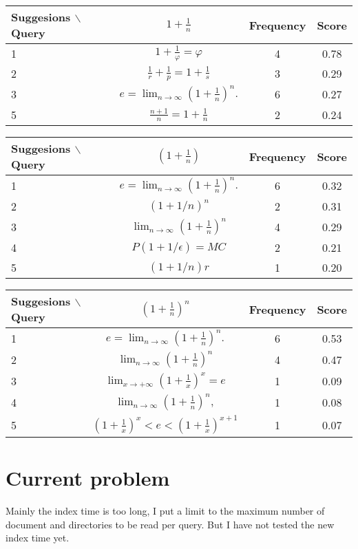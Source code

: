 \documentclass[12pt]{article} %
\begin{document}
\begin{center}
\begin{tabular}{lccc}
Suggesions $\backslash$ Query  & $ 1+\frac 1 n $ & Frequency & Score \\
\hline
 1 &  $ 1+\frac{1}{\varphi}=\varphi $ & 4 & 0.78 \\
 2 &  $ \frac{1}{r}+\frac{1}{p}=1+\frac{1}{s} $ & 3 & 0.29 \\
 3 &  $ e=\lim_{n\to\infty}\left(1+\frac{1}{n}\right)^{n}. $ & 6 & 0.27 \\
 5 &  $ \frac{n+1}{n}=1+\frac{1}{n} $ & 2 & 0.24 \\
\end{tabular}
\end{center}

\begin{center}
\begin{tabular}{lccc}
Suggesions $\backslash$ Query  & $ (1+\frac 1 n) $ & Frequency & Score \\
\hline
 1 &  $ e=\lim_{n\to\infty}\left(1+\frac{1}{n}\right)^{n}. $ & 6 & 0.32 \\
 2 &  $ (1+1/n)^{n} $ & 2 & 0.31 \\
 3 &  $  \lim_{n\to\infty}\left(1+\frac{1}{n}\right)^{n} $ & 4 & 0.29 \\
 4 &  $ P(1+1/{\epsilon})=MC $ & 2 & 0.21 \\
 5 &  $ (1+1/n)r $ & 1 & 0.20 \\
\end{tabular}
\end{center}

\begin{center}
\begin{tabular}{lccc}
Suggesions $\backslash$ Query  & $ (1+\frac 1 n)^n $ & Frequency & Score \\
\hline
 1 &  $ e=\lim_{n\to\infty}\left(1+\frac{1}{n}\right)^{n}. $ & 6 & 0.53 \\
 2 &  $  \lim_{n\to\infty}\left(1+\frac{1}{n}\right)^{n} $ & 4 & 0.47 \\
 3 &  $ \lim_{x\to+\infty}\left(1+\frac{1}{x}\right)^{x}=e $ & 1 & 0.09 \\
 4 &  $ \lim_{n\to\infty}\left(1+\frac{1}{n}\right)^{n}, $ & 1 & 0.08 \\
 5 &  $ \left(1+\frac{1}{x}\right)^{x}<e<\left(1+\frac{1}{x}\right)^{x+1} $ & 1 & 0.07 \\
\end{tabular}
\end{center}

\pagebreak

\section*{Current problem}
Mainly the index time is too long, I put a limit to the maximum number of document and directories to be read per query.
But I have not tested the new index time yet.
\end{document}
